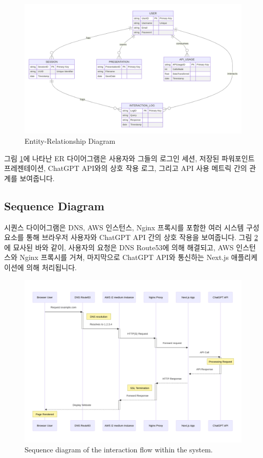 \documentclass[a4paper, 12pt]{article}
\begin{document}
\begin{figure}[H]
\centering
\includegraphics[width=1\textwidth]{img/er_diagram.png}
\caption{Entity-Relationship Diagram}
\label{fig:er_diagram}
\end{figure}

그림 \ref{fig:er_diagram}에 나타난 ER 다이어그램은 사용자와 그들의 로그인 세션, 저장된 파워포인트 프레젠테이션, ChatGPT API와의 상호 작용 로그, 그리고 API 사용 메트릭 간의 관계를 보여줍니다.


\subsection{Sequence Diagram}

시퀀스 다이어그램은 DNS, AWS 인스턴스, Nginx 프록시를 포함한 여러 시스템 구성 요소를 통해 브라우저 사용자와 ChatGPT API 간의 상호 작용을 보여줍니다. 그림 \ref{fig:sequence_diagram}에 묘사된 바와 같이, 사용자의 요청은 DNS Route53에 의해 해결되고, AWS 인스턴스와 Nginx 프록시를 거쳐, 마지막으로 ChatGPT API와 통신하는 Next.js 애플리케이션에 의해 처리됩니다.

\begin{figure}[H]
\centering
\includegraphics[width=1\textwidth]{img/sequence_diagram.png}
\caption{Sequence diagram of the interaction flow within the system.}
\label{fig:sequence_diagram}
\end{figure}
\end{document}
